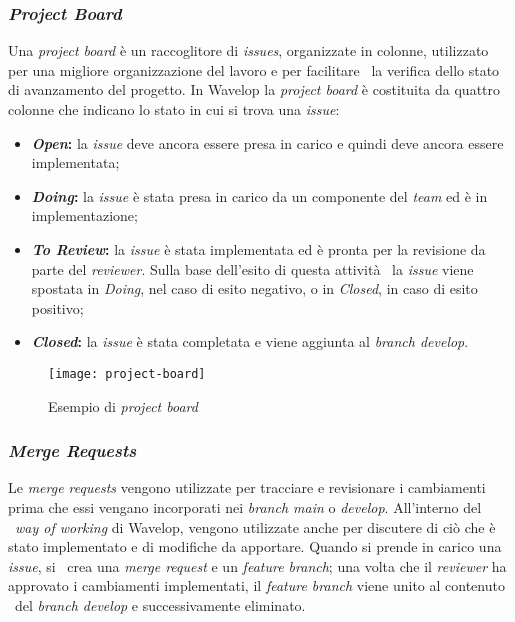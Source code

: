 \newpage
\subsubsection{\emph{Project Board}}
Una \emph{project board} è un raccoglitore di \emph{issues}, organizzate in colonne, utilizzato per una migliore organizzazione del lavoro e per facilitare \
la verifica dello stato di avanzamento del progetto. In Wavelop la \emph{project board} è costituita da quattro colonne che indicano lo stato in cui si trova una \emph{issue}:

\begin{itemize}
  \item \textbf{\emph{Open}:} la \emph{issue} deve ancora essere presa in carico e quindi deve ancora essere implementata;
  \item \textbf{\emph{Doing}:} la \emph{issue} è stata presa in carico da un componente del \emph{team} ed è in implementazione;
  \item \textbf{\emph{To Review}:} la \emph{issue} è stata implementata ed è pronta per la revisione da parte del \emph{reviewer}. Sulla base dell'esito di questa attività \
  la \emph{issue} viene spostata in \emph{Doing}, nel caso di esito negativo, o in \emph{Closed}, in caso di esito positivo;
  \item \textbf{\emph{Closed}:} la \emph{issue} è stata completata e viene aggiunta al \emph{branch develop}.
\end{itemize}

\begin{figure}[!ht]
  \begin{center}
    \texttt{[image: project-board]}
    \caption{Esempio di \emph{project board}}
  \end{center}
\end{figure}

\newpage
\subsubsection{\emph{Merge Requests}}
Le \emph{merge requests} vengono utilizzate per tracciare e revisionare i cambiamenti prima che essi vengano incorporati nei \emph{branch main} o \emph{develop}. All'interno del \
\emph{way of working} di Wavelop, vengono utilizzate anche per discutere di ciò che è stato implementato e di modifiche da apportare. Quando si prende in carico una \emph{issue}, si \
crea una \emph{merge request} e un \emph{feature branch}; una volta che il \emph{reviewer} ha approvato i cambiamenti implementati, il \emph{feature branch} viene unito al contenuto \
del \emph{branch develop} e successivamente eliminato.

